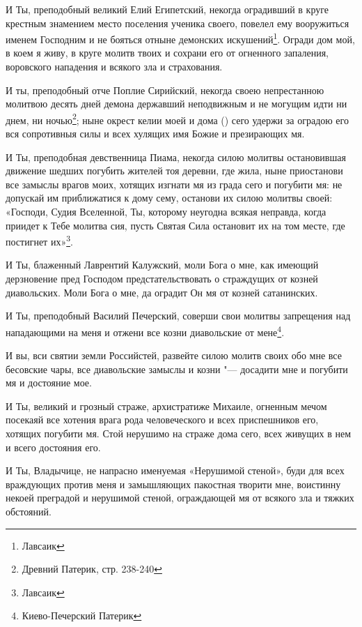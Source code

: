 \begin{mymulticols}
И Ты, преподобный великий Елий Египетский, некогда оградивший в круге крестным знамением место поселения ученика своего, повелел ему вооружиться именем Господним и не бояться отныне демонских искушений\footnote{Лавсаик}. Огради дом мой, в коем я живу, в круге молитв твоих и сохрани его от огненного запаления, воровского нападения и всякого зла и страхования.


И ты, преподобный отче Поплие Сирийский, некогда своею непрестанною молитвою десять дней демона державший неподвижным и не могущим идти ни днем, ни ночью\footnote{Древний Патерик, стр. 238-240}; ныне окрест келии моей и дома () сего удержи за оградою его вся сопротивныя силы и всех хулящих имя Божие и презирающих мя.


И Ты, преподобная девственница Пиама, некогда силою молитвы остановившая движение шедших погубить жителей тоя деревни, где жила, ныне приостанови все замыслы врагов моих, хотящих изгнати мя из града сего и погубити мя: не допускай им приближатися к дому сему, останови их силою молитвы своей: «Господи, Судия Вселенной, Ты, которому неугодна всякая неправда, когда приидет к Тебе молитва сия, пусть Святая Сила остановит их на том месте, где постигнет их»\footnote{Лавсаик}.


И Ты, блаженный Лаврентий Калужский, моли Бога о мне, как имеющий дерзновение пред Господом предстательствовать о страждущих от козней диавольских. Моли Бога о мне, да оградит Он мя от козней сатанинских.


И Ты, преподобный Василий Печерский, соверши свои молитвы запрещения над нападающими на меня и отжени все козни диавольские от мене\footnote{Киево-Печерский Патерик}.


И вы, вси святии земли Российстей, развейте силою молитв своих обо мне все бесовские чары, все диавольские замыслы и козни "--- досадити мне и погубити мя и достояние мое.


И Ты, великий и грозный страже, архистратиже Михаиле, огненным мечом посекаяй все хотения врага рода человеческого и всех приспешников его, хотящих погубити мя. Стой нерушимо на страже дома сего, всех живущих в нем и всего достояния его.


И Ты, Владычице, не напрасно именуемая «Нерушимой стеной», буди для всех враждующих против меня и замышляющих пакостная творити мне, воистинну некоей преградой и нерушимой стеной, ограждающей мя от всякого зла и тяжких обстояний.

\end{mymulticols}

